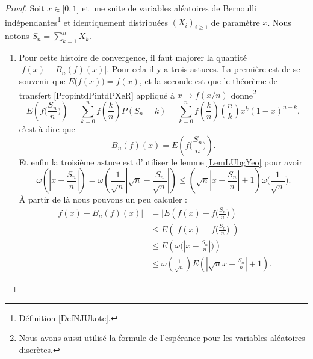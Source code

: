 \begin{proof}
    Soit \( x\in \mathopen[ 0 , 1 \mathclose]\) et une suite de variables aléatoires de Bernoulli indépendantes\footnote{Définition \ref{DefNJUkotc}.} et identiquement distribuées \( (X_i)_{i\geq 1}\) de paramètre \( x\). Nous notons \( S_n=\sum_{k=1}^nX_k\). 

    \begin{enumerate}
        \item
            
            Pour cette histoire de convergence, il faut majorer la quantité \( \big| f(x)-B_n(f)(x) \big|\). Pour cela il y a trois astuces. La première est de se souvenir que \( E\big( f(x) \big)=f(x)\), et la seconde est que le théorème de transfert \ref{PropintdPintdPXeR} appliqué à \( x\mapsto f(x/n)\) donne\footnote{Nous avons aussi utilisé la formule de l'espérance pour les variables aléatoires discrètes.}
        \begin{equation}
            E\left( f\big( \frac{ S_n }{ n } \big) \right)=\sum_{k=0}^nf\left( \frac{ k }{ n } \right)P(S_n=k)=\sum_{k=0}^nf\left( \frac{ k }{ n } \right)\binom{ n }{ k }x^k(1-x)^{n-k},
        \end{equation}
        c'est à dire que 
        \begin{equation}
            B_n(f)(x)=E\left( f\big( \frac{ S_n }{ n } \big) \right).
        \end{equation}
        Et enfin la troisième astuce est d'utiliser le lemme \ref{LemLUbgYeo} pour avoir
        \begin{equation}
            \omega\left( | x-\frac{ S_n }{ n } | \right)=\omega\left( \frac{1}{ \sqrt{n} }| \sqrt{n}-\frac{ S_n }{ \sqrt{n} } | \right)\leq
            \left( \sqrt{n}| x-\frac{ S_n }{ n } |+1 \right)\omega\big( \frac{1}{ \sqrt{n} } \big).
        \end{equation}
        À partir de là nous pouvons un peu calculer :
        \begin{subequations}
            \begin{align}
                \big| f(x)-B_n(f)(x) \big|&=\Big| E\left( f(x)-f\big( \frac{ S_n }{ n } \big) \right)    \Big|\\
                &\leq E\left( | f(x)-f\big( \frac{ S_n }{ n } \big) | \right)\\
                &\leq E\left( \omega\Big( | x-\frac{ S_n }{ n } | \Big) \right)\\
                &\leq \omega\left( \frac{1}{ \sqrt{n} } \right)E\left( | \sqrt{n}x-\frac{ S_n }{ n } |+1 \right).

\end{align}
\end{subequations}
\end{enumerate}
\end{proof}
